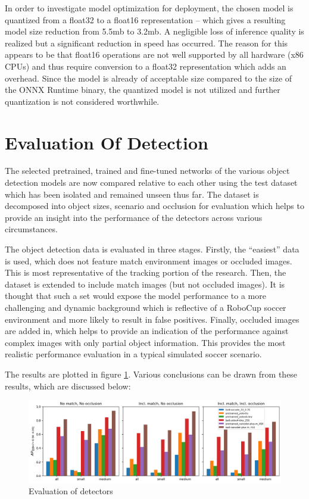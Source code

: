 \documentclass[a4paper,twoside,12pt]{report}
\begin{document}
In order to investigate model optimization for deployment, the chosen model is quantized from a float32 to a float16 representation -- which gives a resulting model size reduction from 5.5mb to 3.2mb. A negligible loss of inference quality is realized but a significant reduction in speed has occurred. The reason for this appears to be that float16 operations are not well supported by all hardware (x86 CPUs) and thus require conversion to a float32 representation which adds an overhead. Since the model is already of acceptable size compared to the size of the ONNX Runtime binary, the quantized model is not utilized and further quantization is not considered worthwhile.

\section{Evaluation Of Detection}

The selected pretrained, trained and fine-tuned networks of the various object detection models are now compared relative to each other using the test dataset which has been isolated and remained unseen thus far. The dataset is decomposed into object sizes, scenario and occlusion for evaluation which helps to provide an insight into the performance of the detectors across various circumstances. 

The object detection data is evaluated in three stages. Firstly, the ``easiest'' data is used, which does not feature match environment images or occluded images. This is most representative of the tracking portion of the research. Then, the dataset is extended to include match images (but not occluded images). It is thought that such a set would expose the model performance to a more challenging and dynamic background which is reflective of a RoboCup soccer environment and more likely to result in false positives. Finally, occluded images are added in, which helps to provide an indication of the performance against complex images with only partial object information. This provides the most realistic performance evaluation in a typical simulated soccer scenario. 

The results are plotted in figure \ref{fig:evaldetect}. Various conclusions can be drawn from these results, which are discussed below:

\begin{figure}[h!]
\begin{center}
\includegraphics[width=15.5cm]{images/eval_detect.png}
\caption{Evaluation of detectors}
\label{fig:evaldetect}
\end{center}
\end{figure}
\end{document}
